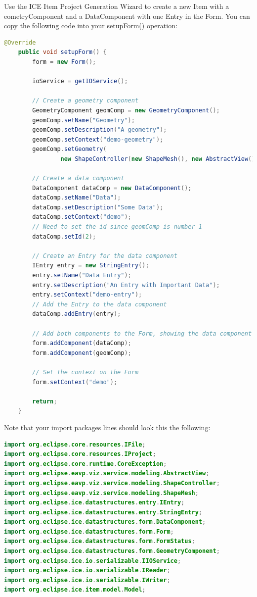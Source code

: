 Use the ICE Item Project Generation Wizard to create a new Item with  a
eometryComponent and a DataComponent with one Entry in the Form. You can copy
the following code into your setupForm() operation:

\begin{lstlisting}[language=java]
@Override
    public void setupForm() {
        form = new Form();

        ioService = getIOService();

        // Create a geometry component
        GeometryComponent geomComp = new GeometryComponent();
        geomComp.setName("Geometry");
        geomComp.setDescription("A geometry");
        geomComp.setContext("demo-geometry");
        geomComp.setGeometry(
                new ShapeController(new ShapeMesh(), new AbstractView()));

        // Create a data component
        DataComponent dataComp = new DataComponent();
        dataComp.setName("Data");
        dataComp.setDescription("Some Data");
        dataComp.setContext("demo");
        // Need to set the id since geomComp is number 1
        dataComp.setId(2);

        // Create an Entry for the data component
        IEntry entry = new StringEntry();
        entry.setName("Data Entry");
        entry.setDescription("An Entry with Important Data");
        entry.setContext("demo-entry");
        // Add the Entry to the data component
        dataComp.addEntry(entry);

        // Add both components to the Form, showing the data component first.
        form.addComponent(dataComp);
        form.addComponent(geomComp);

        // Set the context on the Form
        form.setContext("demo");

        return;
    }
\end{lstlisting}

Note that your import packages lines should look this the following:

\begin{lstlisting}[language=java]
import org.eclipse.core.resources.IFile;
import org.eclipse.core.resources.IProject;
import org.eclipse.core.runtime.CoreException;
import org.eclipse.eavp.viz.service.modeling.AbstractView;
import org.eclipse.eavp.viz.service.modeling.ShapeController;
import org.eclipse.eavp.viz.service.modeling.ShapeMesh;
import org.eclipse.ice.datastructures.entry.IEntry;
import org.eclipse.ice.datastructures.entry.StringEntry;
import org.eclipse.ice.datastructures.form.DataComponent;
import org.eclipse.ice.datastructures.form.Form;
import org.eclipse.ice.datastructures.form.FormStatus;
import org.eclipse.ice.datastructures.form.GeometryComponent;
import org.eclipse.ice.io.serializable.IIOService;
import org.eclipse.ice.io.serializable.IReader;
import org.eclipse.ice.io.serializable.IWriter;
import org.eclipse.ice.item.model.Model;
\end{lstlisting}

